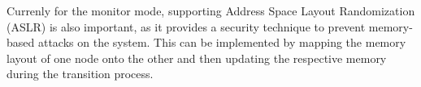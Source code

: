 \documentclass[article, doublespace,nopageskip]{VTthesis} %
\begin{document}
    Currenly for the monitor mode, supporting Address Space Layout Randomization (ASLR) \cite{ASLR} is also important, as it provides a security technique to prevent memory-based attacks on the system. This can be implemented by mapping the memory layout of one node onto the other and then updating the respective memory during the transition process.

    
 
    
    
\end{document}
